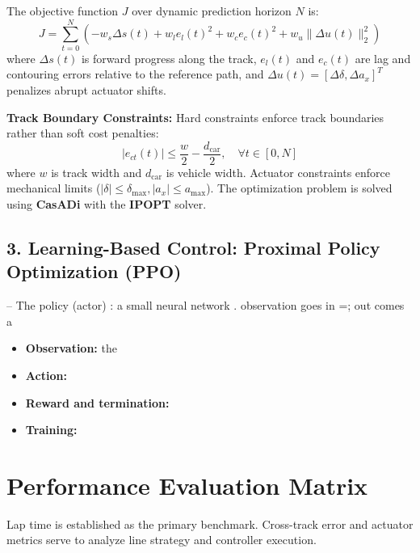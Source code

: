 \documentclass[12pt]{article}
\begin{document}
The objective function $J$ over dynamic prediction horizon $N$ is:
\[ J = \sum_{t=0}^{N} \left( -w_s \Delta s(t) + w_l e_l(t)^2 + w_c e_c(t)^2 + w_u \|\Delta u(t)\|^2_2 \right) \]
where $\Delta s(t)$ is forward progress along the track, $e_l(t)$ and $e_c(t)$ are lag and contouring errors relative to the reference path, and $\Delta u(t) = [\Delta\delta, \Delta a_x]^T$ penalizes abrupt actuator shifts.

\textbf{Track Boundary Constraints:} Hard constraints enforce track boundaries rather than soft cost penalties:
\[ |e_{ct}(t)| \le \frac{w}{2} - \frac{d_{\text{car}}}{2}, \quad \forall t \in [0, N] \]
where $w$ is track width and $d_{\text{car}}$ is vehicle width. Actuator constraints enforce mechanical limits ($|\delta| \le \delta_{\text{max}}, |a_x| \le a_{\text{max}}$). The optimization problem is solved using \textbf{CasADi} with the \textbf{IPOPT} solver.

\subsection*{3. Learning-Based Control: Proximal Policy Optimization (PPO)}
-- The policy (actor) : a small neural network . observation goes in =; out comes a 

\begin{itemize}[noitemsep]
    \item \textbf{Observation:} %
    the 
    \item \textbf{Action:} %

    \item \textbf{Reward and termination:} %

    \item \textbf{Training:} %
\end{itemize}

\section{Performance Evaluation Matrix}
Lap time is established as the primary benchmark. Cross-track error and actuator metrics serve to analyze line strategy and controller execution.
\end{document}

